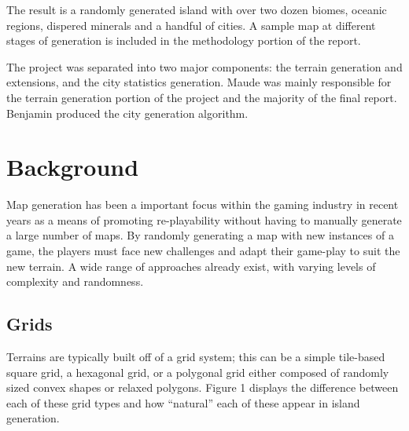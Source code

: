 The result is a randomly generated island with over two dozen biomes, oceanic regions, dispered minerals and a handful of cities. A sample map at different stages of generation is included in the methodology portion of the report. 

The project was separated into two major components: the terrain generation and extensions, and the city statistics generation. Maude was mainly responsible for the terrain generation portion of the project and the majority of the final report. Benjamin produced the city generation algorithm. 

\section{Background}
Map generation has been a important focus within the gaming industry in recent years as a means of promoting re-playability without having to manually generate a large number of maps. By randomly generating a map with new instances of a game, the players must face new challenges and adapt their game-play to suit the new terrain. A wide range of approaches already exist, with varying levels of complexity and randomness.

\subsection{Grids}
Terrains are typically built off of a grid system; this can be a simple tile-based square grid, a hexagonal grid, or a polygonal grid either composed of randomly sized convex shapes or relaxed polygons. Figure 1 displays the difference between each of these grid types and how ``natural'' each of these appear in island generation.

